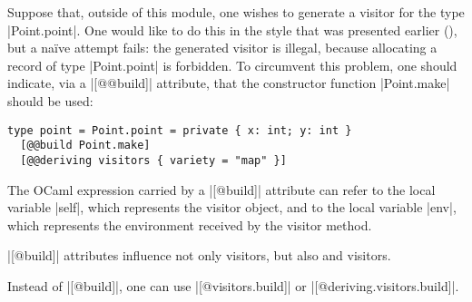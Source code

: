 \documentclass[11pt,a4paper,twoside]{article}
\begin{document}
Suppose that, outside of this module, one wishes to generate a \map visitor
for the type \oc|Point.point|. One would like to do this in the style that was
presented earlier (), but a naïve attempt fails: the
generated visitor is illegal, because allocating a record of type
\oc|Point.point| is forbidden. To circumvent this problem, one should
indicate, via a \oc|[@@build]| attribute, that the constructor function
\oc|Point.make| should be used:
%
\begin{origenv}
\begin{lstlisting}
type point = Point.point = private { x: int; y: int }
  [@@build Point.make]
  [@@deriving visitors { variety = "map" }]
\end{lstlisting}
\end{origenv}
%

The OCaml expression carried by a \oc|[@build]| attribute can refer to the
local variable \oc|self|, which represents the visitor object, and to the
local variable \oc|env|, which represents the environment received by the
visitor method.

\oc|[@build]| attributes influence not only \map visitors,
but also \mapendo and \mapreduce visitors.

Instead of \oc|[@build]|, one can use
\oc|[@visitors.build]| or \oc|[@deriving.visitors.build]|.





\end{document}
